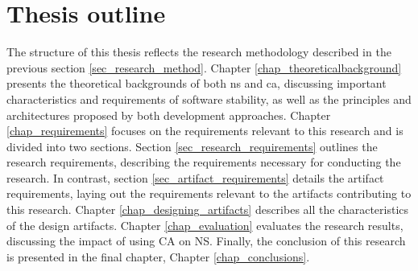 \section{Thesis outline} \label{sec_structure}

The structure of this thesis reflects the research methodology described in the previous
section \ref{sec_research_method}. Chapter \ref{chap_theoreticalbackground} presents the
theoretical backgrounds of both \gls{ns} and \gls{ca}, discussing important
characteristics and requirements of software stability, as well as the principles and
architectures proposed by both development approaches. Chapter \ref{chap_requirements}
focuses on the requirements relevant to this research and is divided into two sections.
Section \ref{sec_research_requirements} outlines the research requirements, describing the
requirements necessary for conducting the research. In contrast, section
\ref{sec_artifact_requirements} details the artifact requirements, laying out the
requirements relevant to the artifacts contributing to this research. Chapter
\ref{chap_designing_artifacts} describes all the characteristics of the design artifacts.
Chapter \ref{chap_evaluation} evaluates the research results, discussing the impact of
using CA on NS. Finally, the conclusion of this research is presented in the final
chapter, Chapter \ref{chap_conclusions}.